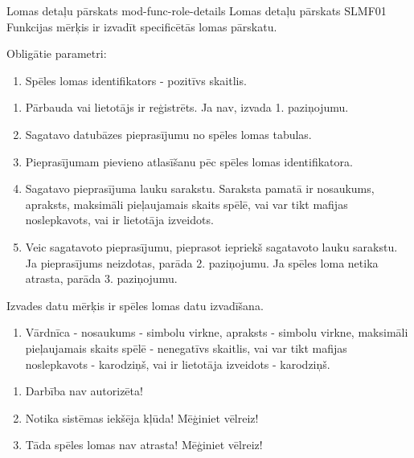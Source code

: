 \moduleFunctionTable
{Lomas detaļu pārskats}
{mod-func-role-details}
{Lomas detaļu pārskats}
{SLMF01}
{
	Funkcijas mērķis ir izvadīt specificētās lomas pārskatu.
}
{
	Obligātie parametri:
	\begin{enumerate}
		\item Spēles lomas identifikators - pozitīvs skaitlis.
	\end{enumerate}
}
{
	\begin{enumerate}
		\item Pārbauda vai lietotājs ir reģistrēts.
		      Ja nav, izvada 1. paziņojumu.
		\item Sagatavo datubāzes pieprasījumu no spēles lomas tabulas.
		\item Pieprasījumam pievieno atlasīšanu pēc spēles lomas identifikatora.
		\item Sagatavo pieprasījuma lauku sarakstu.
		      Saraksta pamatā ir nosaukums, apraksts, maksimāli pieļaujamais skaits spēlē, vai var tikt mafijas noslepkavots, vai ir lietotāja izveidots.
		\item Veic sagatavoto pieprasījumu, pieprasot iepriekš sagatavoto lauku sarakstu.
		      Ja pieprasījums neizdotas, parāda 2. paziņojumu.
		      Ja spēles loma netika atrasta, parāda 3. paziņojumu.
	\end{enumerate}
}
{
	Izvades datu mērķis ir spēles lomas datu izvadīšana.
	\begin{enumerate}
		\item Vārdnīca - nosaukums - simbolu virkne, apraksts - simbolu virkne, maksimāli pieļaujamais
		      skaits spēlē - nenegatīvs skaitlis, vai var tikt mafijas noslepkavots - karodziņš, vai ir lietotāja izveidots - karodziņš.
	\end{enumerate}
}
{
	\begin{enumerate}
		\item Darbība nav autorizēta!
		\item Notika sistēmas iekšēja kļūda! Mēģiniet vēlreiz!
		\item Tāda spēles lomas nav atrasta! Mēģiniet vēlreiz!
	\end{enumerate}
}
